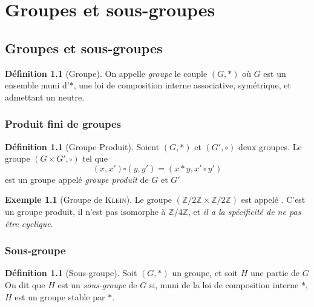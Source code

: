 \documentclass[11pt,a4paper]{report}
\theoremstyle{definition}
\newtheorem{dfn}[theorem]{Définition}
\newtheorem{exemple}[theorem]{Exemple}
\begin{document}
\chapter{Groupes et sous-groupes}
\section{Groupes et sous-groupes} %
\label{sec:definition_d_un_groupe}
\begin{dfn}[Groupe]
     On appelle \emph{groupe} le couple $(G,*)$ où $G$ est un ensemble muni d'$*$, une loi de composition interne associative, symétrique, et admettant un neutre.
\end{dfn}

\subsection{Produit fini de groupes} %
\label{sub:produit_fini_de_groupes}
\begin{dfn}[Groupe Produit]
     Soient $(G,*)$ et $(G',\circ)$ deux groupes. \newline
     Le groupe $\left( G\times G', \square \right)$ tel que
     \[
         (x,x')\square (y,y') = (x*y,x'\circ y')
     \]
     est un groupe appelé \emph{groupe produit} de $G$ et $G'$
\end{dfn}
\begin{exemple}[Groupe de \textsc{Klein}]\label{ex:groupe_de_klein}
     Le groupe $(\mathbb{Z}/2\mathbb{Z} \times \mathbb{Z}/2\mathbb{Z})$ est appelé . C'est un groupe produit, il n'est pas isomorphe à $\mathbb{Z}/4\mathbb{Z}$, et \emph{il a la spécificité de ne pas être cyclique}. 
\end{exemple}

\subsection{Sous-groupe} %
\label{sec:sous_groupe}
\begin{dfn}[Sous-groupe]
     Soit $(G,*)$ un groupe, et soit $H$ une partie de $G$\\
     On dit que $H$ est un \emph{sous-groupe} de $G$ si, muni de la loi de composition interne $*$, $H$ est un groupe stable par $*$.
\end{dfn}
\end{document}
